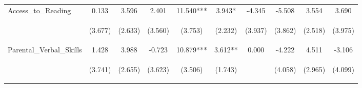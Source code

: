 \begin{tabular}{lccccccccc}
\noalign{\smallskip}Access_to_Reading & 0.133 & 3.596 & 2.401 & 11.540*** & 3.943* & -4.345 & -5.508 & 3.554 & 3.690\\
 & \begin{footnotesize}(3.677)\end{footnotesize} & \begin{footnotesize}(2.633)\end{footnotesize} & \begin{footnotesize}(3.560)\end{footnotesize} & \begin{footnotesize}(3.753)\end{footnotesize} & \begin{footnotesize}(2.232)\end{footnotesize} & \begin{footnotesize}(3.937)\end{footnotesize} & \begin{footnotesize}(3.862)\end{footnotesize} & \begin{footnotesize}(2.518)\end{footnotesize} & \begin{footnotesize}(3.975)\end{footnotesize}\\
\noalign{\smallskip}Parental_Verbal_Skills & 1.428 & 3.988 & -0.723 & 10.879*** & 3.612** & 0.000 & -4.222 & 4.511 & -3.106\\
 & \begin{footnotesize}(3.741)\end{footnotesize} & \begin{footnotesize}(2.655)\end{footnotesize} & \begin{footnotesize}(3.623)\end{footnotesize} & \begin{footnotesize}(3.506)\end{footnotesize} & \begin{footnotesize}(1.743)\end{footnotesize} & \begin{footnotesize}\end{footnotesize} & \begin{footnotesize}(4.058)\end{footnotesize} & \begin{footnotesize}(2.965)\end{footnotesize} & \begin{footnotesize}(4.099)\end{footnotesize}\\

\end{tabular}
